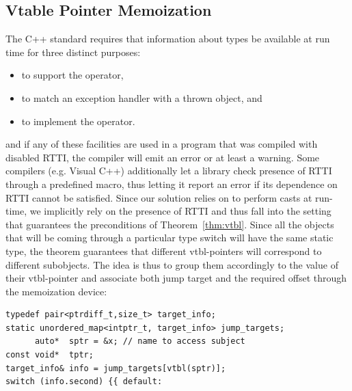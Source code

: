 \subsection{Vtable Pointer Memoization}
\label{sec:vtblmem}


The C++ standard requires that information about types be available at run time 
for three distinct purposes:

\begin{itemize}
\setlength{\itemsep}{0pt}
\setlength{\parskip}{0pt}
\item to support the  operator,
\item to match an exception handler with a thrown object, and
\item to implement the  operator.
\end{itemize}

\noindent
and if any of these facilities are used in a program that was compiled with 
disabled RTTI, the compiler will emit an error or at least a warning. Some 
compilers (e.g. Visual C++) additionally let a library check presence of RTTI 
through a predefined macro, thus letting it report an error if its dependence on 
RTTI cannot be satisfied. Since our solution relies on  to 
perform casts at run-time, we implicitly rely on the presence of RTTI and thus 
fall into the setting that guarantees the preconditions of Theorem~\ref{thm:vtbl}.
Since all the objects that will be coming through a particular type switch will 
have the same static type, the theorem guarantees that different vtbl-pointers 
will correspond to different subobjects. The idea is thus to group them 
accordingly to the value of their vtbl-pointer and associate both jump target 
and the required offset through the memoization device:

\begin{lstlisting}
typedef pair<ptrdiff_t,size_t> target_info;
static unordered_map<intptr_t, target_info> jump_targets;
      auto*  sptr = &x; // name to access subject
const void*  tptr; 
target_info& info = jump_targets[vtbl(sptr)];
switch (info.second) {{ default: 
\end{lstlisting}

